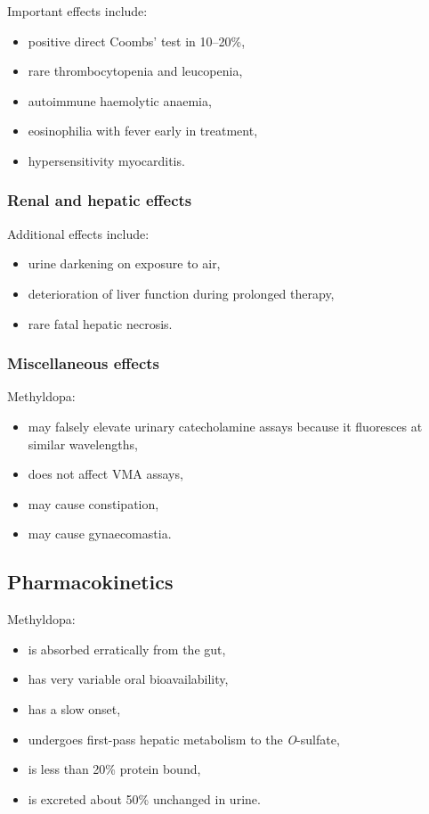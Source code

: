 \documentclass[11pt,a4paper]{article}
\begin{document}
Important effects include:
\begin{itemize}
    \item positive direct Coombs' test in 10--20\%,
    \item rare thrombocytopenia and leucopenia,
    \item autoimmune haemolytic anaemia,
    \item eosinophilia with fever early in treatment,
    \item hypersensitivity myocarditis.
\end{itemize}

\subsubsection{Renal and hepatic effects}

Additional effects include:
\begin{itemize}
    \item urine darkening on exposure to air,
    \item deterioration of liver function during prolonged therapy,
    \item rare fatal hepatic necrosis.
\end{itemize}

\subsubsection{Miscellaneous effects}

Methyldopa:
\begin{itemize}
    \item may falsely elevate urinary catecholamine assays because it fluoresces at similar wavelengths,
    \item does not affect VMA assays,
    \item may cause constipation,
    \item may cause gynaecomastia.
\end{itemize}

\subsection{Pharmacokinetics}

Methyldopa:
\begin{itemize}
    \item is absorbed erratically from the gut,
    \item has very variable oral bioavailability,
    \item has a slow onset,
    \item undergoes first-pass hepatic metabolism to the \emph{O}-sulfate,
    \item is less than 20\% protein bound,
    \item is excreted about 50\% unchanged in urine.
\end{itemize}
\end{document}
